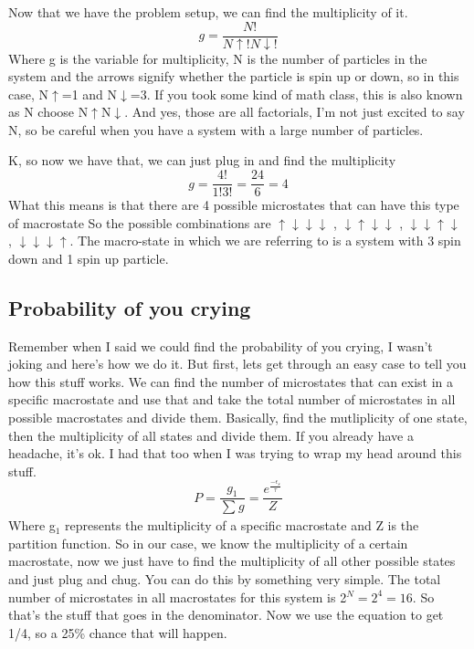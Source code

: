 \documentclass[arial]{article}
\begin{document}
Now that we have the problem setup, we can find the multiplicity of it.
\begin{equation}
g=\frac{N!}{N\uparrow!  N\downarrow!}
\end{equation}
Where g is the variable for multiplicity, N is the number of particles in the system and the arrows signify whether the particle is spin up or down, so in this case, N$\uparrow$=1 and N$\downarrow$=3. If you took some kind of math class, this is also known as N choose N$\uparrow$N$\downarrow$. And yes, those are all factorials, I'm not just excited to say N, so be careful when you have a system with a large number of particles.
\vspace{3mm}

K, so now we have that, we can just plug in and find the multiplicity
\begin{equation}
g=\frac{4!}{1!  3!}=\frac{24}{6}=4
\end{equation}
What this means is that there are 4 possible microstates that can have this type of macrostate So the possible combinations are $\uparrow \downarrow \downarrow \downarrow$ , $ \downarrow\uparrow \downarrow \downarrow$ , $\downarrow \downarrow \uparrow\downarrow$ , $\downarrow \downarrow \downarrow\uparrow$. The macro-state in which we are referring to is a system with 3 spin down and 1 spin up particle. 

\subsection*{Probability of you crying}
Remember when I said we could find the probability of you crying, I wasn't joking and here's how we do it. But first, lets get through an easy case to tell you how this stuff works. We can find the number of microstates that can exist in a specific macrostate and use that and take the total number of microstates in all possible macrostates and divide them. Basically, find the mutliplicity of one state, then the multiplicity of all states and divide them. If you already have a headache, it's ok. I had that too when I was trying to wrap my head around this stuff.
\begin{equation}
P=\frac{g_1}{\sum_{}^{}g}=\frac{e^{\frac{-\epsilon_s}{\tau}}}{Z}
\end{equation}
Where g$_1$ represents the multiplicity of a specific macrostate and Z is the partition function. So in our case, we know the multiplicity of a certain macrostate, now we just have to find the multiplicity of all other possible states and just plug and chug. You can do this by something very simple. The total number of microstates in all macrostates for this system is 2$^N = 2^4 = 16$. So that's the stuff that goes in the denominator. Now we use the equation to get 1/4, so a 25\% chance that will happen.
\vspace{3mm}
\end{document}
